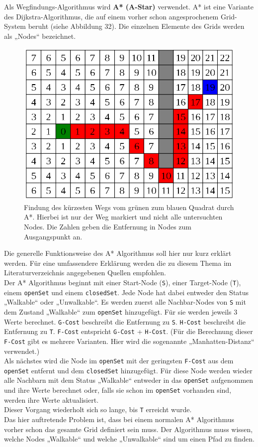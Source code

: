 \documentclass[a4paper,12pt]{article}
\newcommand{\code}{\texttt}
\begin{document}
Als Wegfindungs-Algorithmus wird \textbf{A* (A-Star)} verwendet. A* ist eine Variante des Dijkstra-Algorithmus, die auf einem vorher schon angesprochenem Grid-System beruht (siehe Abbildung 32). Die einzelnen Elemente des Grids werden als „Nodes“ bezeichnet.
\begin{figure}[H]
\centering
    \includegraphics[width=.8\linewidth]{Bilder/Aufgabe3/Teilaufgabe_A/AStar_01.png}
    \caption{Findung des kürzesten Wegs vom grünen zum blauen Quadrat durch A*. Hierbei ist nur der Weg markiert und nicht alle untersuchten Nodes. Die Zahlen geben die Entfernung in Nodes zum Ausgangspunkt an.}
\end{figure}

Die generelle Funktionsweise des A* Algorithmus soll hier nur kurz erklärt werden. Für eine umfassendere Erklärung werden die zu diesem Thema im Literaturverzeichnis angegebenen Quellen empfohlen.
\\[0.4cm]
Der A* Algorithmus beginnt mit einer Start-Node (\code{S}), einer Target-Node (\code{T}), einem \code{openSet} und einem \code{closedSet}. Jede Node hat dabei entweder den Status „Walkable“ oder „Unwalkable“. Es werden zuerst alle Nachbar-Nodes von \code{S} mit dem Zustand „Walkable“ zum \code{openSet} hinzugefügt. Für sie werden jeweils 3 Werte berechnet. \code{G-Cost} beschreibt die Entfernung zu \code{S}. \code{H-Cost} beschreibt die Entfernung zu \code{T}. \code{F-Cost} entspricht \code{G-Cost} + \code{H-Cost}. (Für die Berechnung dieser \code{F-Cost} gibt es mehrere Varianten. Hier wird die sogenannte „Manhatten-Distanz“ verwendet.)
\\[0.4cm]
Als nächstes wird die Node im \code{openSet} mit der geringsten \code{F-Cost} aus dem \code{openSet} entfernt und dem \code{closedSet} hinzugefügt. Für diese Node werden wieder alle Nachbarn mit dem Status „Walkable“ entweder in das \code{openSet} aufgenommen und ihre Werte berechnet oder, falls sie schon im \code{openSet} vorhanden sind, werden ihre Werte aktualisiert.
\\[0.4cm]
Dieser Vorgang wiederholt sich so lange, bis \code{T} erreicht wurde.
\\[0.4cm]
Das hier auftretende Problem ist, dass bei einem normalen A* Algorithmus vorher schon das gesamte Grid definiert sein muss. Der Algorithmus muss wissen, welche Nodes „Walkable“ und welche „Unwalkable“ sind um einen Pfad zu finden.
\end{document}
